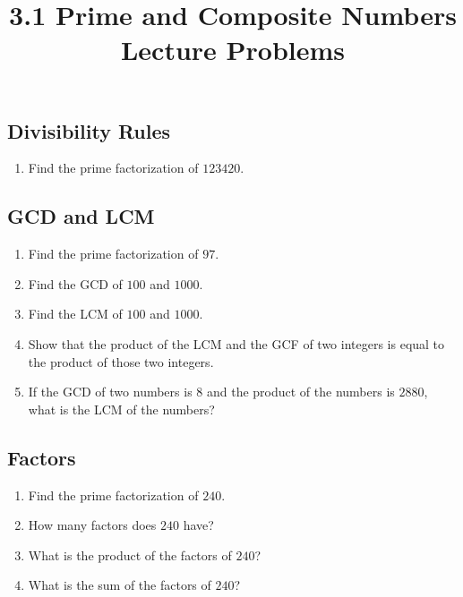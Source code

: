 \documentclass{article}
\title{3.1 Prime and Composite Numbers Lecture Problems}
\author{}
\date{}
\begin{document}
\maketitle

\subsection*{Divisibility Rules}
\begin{enumerate}
    \item Find the prime factorization of $123420$.
        \vspace{3cm}
\end{enumerate}

\subsection*{GCD and LCM}
\begin{enumerate}[resume]
    \item Find the prime factorization of $97$.
        \vspace{3cm}
    \item Find the GCD of $100$ and $1000$.
        \vspace{3cm}
    \item Find the LCM of $100$ and $1000$.
        \vspace{3cm}
    \item Show that the product of the LCM and the GCF of two integers
        is equal to the product of those two integers.
        \vspace{3cm}
    \item If the GCD of two numbers is $8$ and the product of the numbers is $2880$,
        what is the LCM of the numbers?
        \vspace{3cm}
\end{enumerate}

\subsection*{Factors}
\begin{enumerate}[resume]
    \item Find the prime factorization of $240$.
        \vspace{3cm}
    \item How many factors does $240$ have?
        \vspace{3cm}
    \item What is the product of the factors of $240$?
        \vspace{3cm}
    \item What is the sum of the factors of $240$?
        \vspace{3cm}
\end{enumerate}
\end{document}
